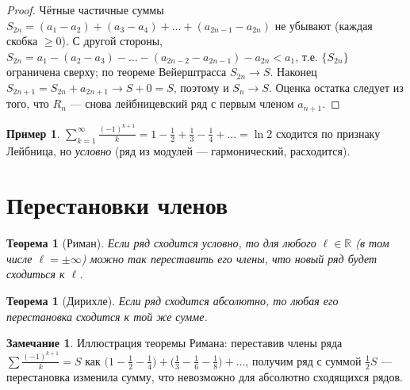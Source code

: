 \documentclass[11pt,a4paper]{article}
\theoremstyle{definition}
\newtheorem{example}[definition]{Пример}
\newtheorem{remark}[definition]{Замечание}
\theoremstyle{plain}
\newtheorem{theorem}[definition]{Теорема}
\newcommand{\R}{\mathbb{R}}
\renewcommand{\ge}{\geqslant}
\begin{document}
\begin{proof}
Чётные частичные суммы $S_{2n}=(a_1-a_2)+(a_3-a_4)+\dots+(a_{2n-1}-a_{2n})$ не убывают (каждая
скобка $\ge0$). С другой стороны, $S_{2n}=a_1-(a_2-a_3)-\dots-(a_{2n-2}-a_{2n-1})-a_{2n}<a_1$,
т.е. $\{S_{2n}\}$ ограничена сверху; по теореме Вейерштрасса $S_{2n}\to S$. Наконец
$S_{2n+1}=S_{2n}+a_{2n+1}\to S+0=S$, поэтому и $S_n\to S$. Оценка остатка следует из того, что
$R_n$ — снова лейбницевский ряд с первым членом $a_{n+1}$.
\end{proof}

\begin{example}
$\displaystyle\sum_{k=1}^\infty\frac{(-1)^{k+1}}{k}=1-\frac12+\frac13-\frac14+\dots=\ln2$ сходится
по признаку Лейбница, но \emph{условно} (ряд из модулей — гармонический, расходится).
\end{example}

\section{Перестановки членов}

\begin{theorem}[Риман]
Если ряд сходится условно, то для любого $\ell\in\R$ (в том числе $\ell=\pm\infty$) можно так
переставить его члены, что новый ряд будет сходиться к $\ell$.
\end{theorem}

\begin{theorem}[Дирихле]
Если ряд сходится абсолютно, то любая его перестановка сходится к той же сумме.
\end{theorem}

\begin{remark}
Иллюстрация теоремы Римана: переставив члены ряда
$\sum\frac{(-1)^{k+1}}{k}=S$ как
$\bigl(1-\tfrac12-\tfrac14\bigr)+\bigl(\tfrac13-\tfrac16-\tfrac18\bigr)+\dots$, получим ряд с
суммой $\tfrac12 S$ — перестановка изменила сумму, что невозможно для абсолютно сходящихся рядов.
\end{remark}
\end{document}
